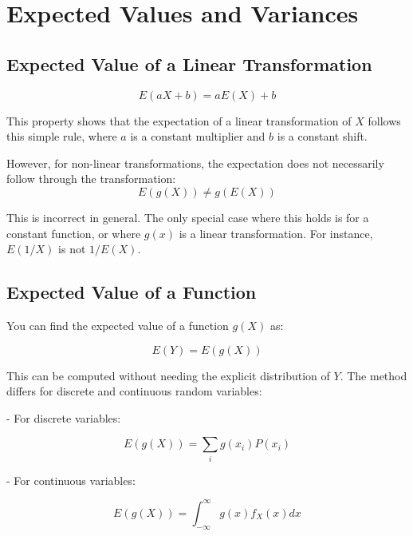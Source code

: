 \setchapterabstract{
}
\chapter{Expected Values and Variances}
\vspace{-1.5cm}



{\chaptoc\noindent\begin{minipage}[inner sep=0,outer sep=0]{0.9\linewidth}
    \section{Expected Value of a Linear Transformation}\end{minipage}}

\[
E(aX + b) = aE(X) + b
\]

This property shows that the expectation of a linear transformation of \(X\) follows this simple rule, where \(a\) is a constant multiplier and \(b\) is a constant shift.

However, for non-linear transformations, the expectation does not necessarily follow through the transformation:
\[
E(g(X)) \neq g(E(X))
\]

This is incorrect in general. The only special case where this holds is for a constant function, or where \(g(x)\) is a linear transformation. For instance, \(E(1/X)\) is not \(1/E(X)\).


\section{Expected Value of a Function}

You can find the expected value of a function \( g(X) \) as:

\[
E(Y) = E(g(X))
\]

This can be computed without needing the explicit distribution of \( Y \). The method differs for discrete and continuous random variables:

- For discrete variables: 

\[
E(g(X)) = \sum_i g(x_i) P(x_i)
\]

- For continuous variables: 

\[
E(g(X)) = \int_{-\infty}^{\infty} g(x) f_X(x) dx
\]


